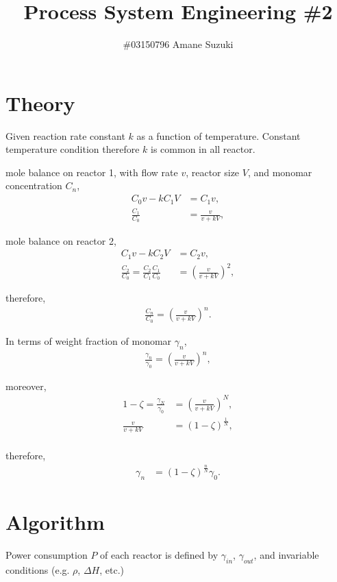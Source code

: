 \documentclass[a4paper,titlepage]{article}
\begin{document}
  \title{Process System Engineering \#2}
  \author{\#03150796 Amane Suzuki}
  \date{}
  \maketitle

  \section{Theory}
  Given reaction rate constant $k$ as a function of temperature.
  Constant temperature condition therefore $k$ is common in all reactor.

  mole balance on reactor 1, with flow rate $v$, reactor size $V$,
  and monomar concentration $C_n$,
  \begin{align}
    C_0v - kC_1V &= C_1v, \\
    \frac{C_1}{C_0} &= \frac{v}{v+kV},
  \end{align}

  mole balance on reactor 2,
  \begin{align}
    C_1v - kC_2V &= C_2v, \\
    \frac{C_2}{C_0} = \frac{C_2}{C_1}\frac{C_1}{C_0} &= \left(\frac{v}{v+kV}\right)^2,
  \end{align}

  therefore,
  \begin{align}
    \frac{C_n}{C_0} = \left(\frac{v}{v+kV}\right)^n.
  \end{align}

  In terms of weight fraction of monomar $\gamma_n$,
  \begin{align}
    \frac{\gamma_n}{\gamma_0} = \left(\frac{v}{v+kV}\right)^n,
  \end{align}

  moreover,
  \begin{align}
    1-\zeta = \frac{\gamma_N}{\gamma_0} &= \left(\frac{v}{v+kV}\right)^N, \\
    \frac{v}{v+kV} &= (1- \zeta)^\frac{1}{N}, \label{eq:prop} \\
  \end{align}

  therefore,
  \begin{align}
    \gamma_n &= (1-\zeta)^\frac{n}{N}\gamma_0.
  \end{align}

  \section{Algorithm}
  Power consumption $P$ of each reactor is defined by $\gamma_{in}$, $\gamma_{out}$,
  and invariable conditions (e.g. $\rho$, $\Delta H$, etc.)
\end{document}
